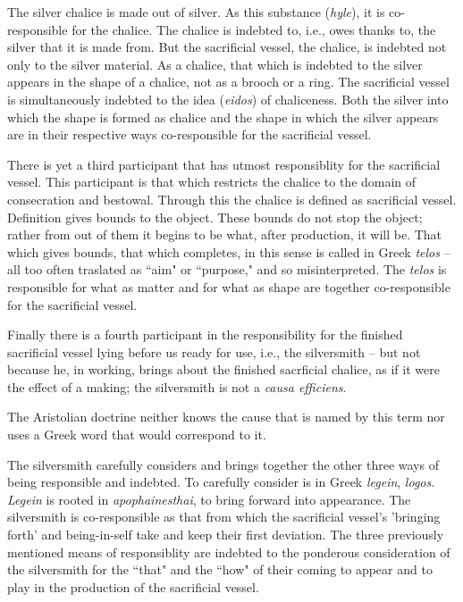 \documentclass[12pt]{article}
\begin{document}
The silver chalice is made out of silver. As this substance (\textit{hyle}), it is co-responsible for the chalice. The chalice is indebted to, i.e., owes thanks to, the silver that it is made from. But the sacrificial vessel, the chalice, is indebted not only to the silver material. As a chalice, that which is indebted to the silver appears in the shape of a chalice, not as a brooch or a ring. The sacrificial vessel is simultaneously indebted to the idea (\textit{eidos}) of chaliceness. Both the silver into which the shape is formed as chalice and the shape in which the silver appears are in their respective ways co-responsible for the sacrificial vessel.

There is yet a third participant that has utmost responsiblity for the sacrificial vessel. This participant is that which restricts the chalice to the domain of consecration and bestowal. Through this the chalice is defined as sacrificial vessel. Definition gives bounds to the object. These bounds do not stop the object; rather from out of them it begins to be what, after production, it will be. That which gives bounds, that which completes, in this sense is called in Greek \textit{telos} -- all too often traslated as ``aim" or ``purpose," and so misinterpreted. The \textit{telos} is responsible for what as matter and for what as shape are together co-responsible for the sacrificial vessel.

Finally there is a fourth participant in the responsibility for the finished sacrificial vessel lying before us ready for use, i.e., the silversmith -- but not because he, in working, brings about the finished sacrficial chalice, as if it were the effect of a making; the silversmith is not a \textit{causa efficiens}.

The Aristolian doctrine neither knows the cause that is named by this term nor uses a Greek word that would correspond to it.

The silversmith carefully considers and brings together the other three ways of being responsible and indebted. To carefully consider is in Greek \textit{legein}, \textit{logos}. \textit{Legein} is rooted in \textit{apophainesthai}, to bring forward into appearance. The silversmith is co-responsible as that from which the sacrificial vessel's 'bringing forth' and being-in-self take and keep their first deviation. The three previously mentioned means of responsiblity are indebted to the ponderous consideration of the silversmith for the ``that" and the ``how" of their coming to appear and to play in the production of the sacrificial vessel.
\end{document}
